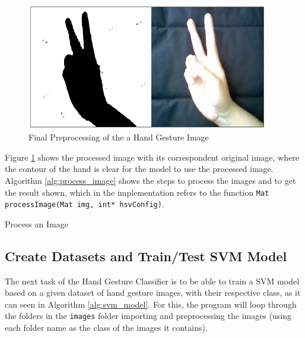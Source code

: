 \documentclass[a4paper,10pt,english]{article}
\begin{document}
        \begin{figure}[h!]
            \centering
            \includegraphics[width=300pt]{images/processing}
            \caption{Final Preprocessing of the a Hand Gesture Image} \label{fig:processing}
        \end{figure}
    
        
        Figure \ref{fig:processing} shows the processed image with its correspondent original image, where the contour of the hand is clear for the model to use the processed image. Algorithm \ref{alg:process_image} shows the steps to process the images and to get the result shown, which in the implementation refers to the function \texttt{Mat processImage(Mat img, int* hsvConfig)}.
        
        \IncMargin{1em}
        \begin{algorithm}[H]
            \BlankLine
            \caption{Process an Image} \label{alg:process_image}
        \end{algorithm}
        
        \subsection{Create Datasets and Train/Test SVM Model}
        
        The next task of the Hand Gesture Classifier is to be able to train a SVM model based on a given dataset of hand gesture images, with their respective class, as it can seen in Algorithm \ref{alg:svm_model}. For this, the program will loop through the folders in the \texttt{images} folder importing and preprocessing the images (using each folder name as the class of the images it contains).
        
\end{document}
